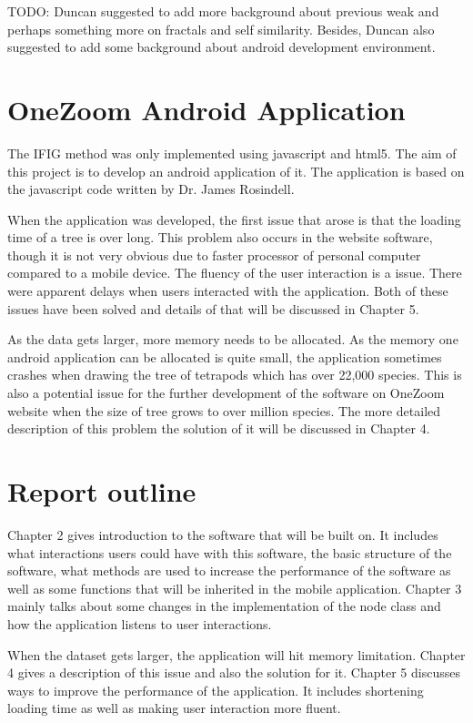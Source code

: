\documentclass[MSc]{icldt}
\begin{document}
TODO: Duncan suggested to add more background about previous weak and perhaps something more on fractals and self similarity. Besides, Duncan also suggested to add some background about android development environment.



\section{OneZoom Android Application}

The IFIG method was only implemented using javascript and html5. The aim of this project is to develop an android application of it. The application is based on the javascript code written by Dr. James Rosindell. 

When the application was developed, the first issue that arose is that the loading time of a tree is over long. This problem also occurs in the website software, though it is not very obvious due to faster processor of personal computer compared to a mobile device. The fluency of the user interaction is a issue. There were apparent delays when users interacted with the application. Both of these issues have been solved and details of that will be discussed in Chapter 5.

As the data gets larger, more memory needs to be allocated. As the memory one android application can be allocated is quite small, the application sometimes crashes when drawing the tree of tetrapods which has over 22,000 species. This is also a potential issue for the further development of the software on OneZoom website when the size of tree grows to over million species. The more detailed description of this problem the solution of it will be discussed in Chapter 4.



\section{Report outline}

Chapter 2 gives introduction to the software that will be built on. It includes what interactions users could have with this software, the basic structure of the software, what methods are used to increase the performance of the software as well as some functions that will be inherited in the mobile application. Chapter 3 mainly talks about some changes in the implementation of the node class and how the application listens to user interactions. 

 When the dataset gets larger, the application will hit memory limitation. Chapter 4 gives a description of this issue and also the solution for it. Chapter 5 discusses ways to improve the performance of the application. It includes shortening loading time as well as making user interaction more fluent.
 
\end{document}
